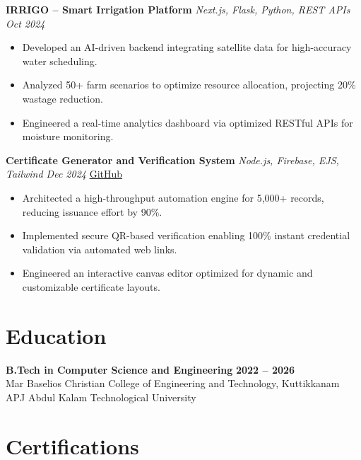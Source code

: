 \documentclass[a4paper,10pt]{article}
\begin{document}
\vspace{2pt}

\textbf{IRRIGO -- Smart Irrigation Platform} \hfill \textit{Next.js, Flask, Python, REST APIs \quad Oct 2024}
\begin{itemize}
\item Developed an AI-driven backend integrating satellite data for high-accuracy water scheduling.
\item Analyzed 50+ farm scenarios to optimize resource allocation, projecting 20\% wastage reduction.
\item Engineered a real-time analytics dashboard via optimized RESTful APIs for moisture monitoring.
\end{itemize}

\vspace{2pt}

\textbf{Certificate Generator and Verification System} \hfill \textit{Node.js, Firebase, EJS, Tailwind \quad Dec 2024} \quad \href{https://github.com/bbinxx/advanced-certificate-generator}{GitHub}
\begin{itemize}
\item Architected a high-throughput automation engine for 5,000+ records, reducing issuance effort by 90\%.
\item Implemented secure QR-based verification enabling 100\% instant credential validation via automated web links.
\item Engineered an interactive canvas editor optimized for dynamic and customizable certificate layouts.
\end{itemize}

\section*{Education}

\textbf{B.Tech in Computer Science and Engineering} \hfill \textbf{2022 -- 2026}\\
Mar Baselios Christian College of Engineering and Technology, Kuttikkanam \hfill APJ Abdul Kalam Technological University

\section*{Certifications}
\end{document}
